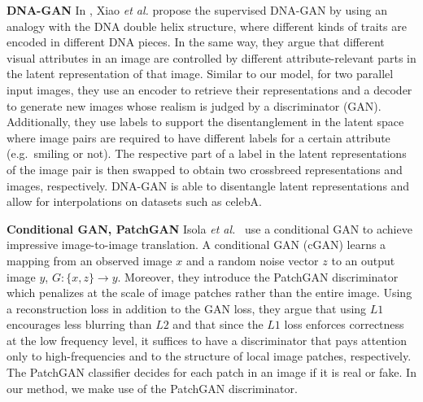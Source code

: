 \documentclass[a4paper,12pt]{report}
\begin{document}
\par \textbf{DNA-GAN} In \cite{DnaGan}, Xiao \textit{et al.} propose the supervised DNA-GAN by using an analogy with the DNA double helix structure, where different kinds of traits are encoded in different DNA pieces. In the same way, they argue that different visual attributes in an image are controlled by different attribute-relevant parts in the latent representation of that image. Similar to our model, for two parallel input images, they use an encoder to retrieve their representations and a decoder to generate new images whose realism is judged by a discriminator (GAN). Additionally, they use labels to support the disentanglement in the latent space where image pairs are required to have different labels for a certain attribute (e.g.\ smiling or not). The respective part of a label in the latent representations of the image pair is then swapped to obtain two crossbreed representations and images, respectively. DNA-GAN is able to disentangle latent representations and allow for interpolations on datasets such as celebA.

\par \textbf{Conditional GAN, PatchGAN} Isola \textit{et al.}~\cite{CondGAN_PatchGAN} use a conditional GAN to achieve impressive image-to-image translation. A conditional GAN (cGAN) learns a mapping from an observed image $x$ and a random noise vector $z$ to an output image $y$, $G : \{x,z\} \rightarrow y$. Moreover, they introduce the PatchGAN discriminator which penalizes at the scale of image patches rather than the entire image. Using a reconstruction loss in addition to the GAN loss, they argue that using $L1$ encourages less blurring than $L2$ and that since the $L1$ loss enforces correctness at the low frequency level, it suffices to have a discriminator that pays attention only to high-frequencies and to the structure of local image patches, respectively. The PatchGAN classifier decides for each patch in an image if it is real or fake. In our method, we make use of the PatchGAN discriminator.
\end{document}
